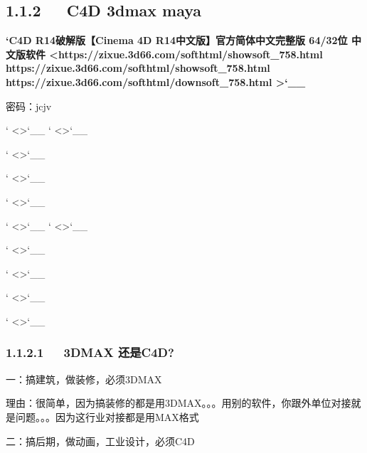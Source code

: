 \documentclass[letterpaper,12pt,english]{sphinxmanual}
\begin{document}
\subsection{1.1.2   C4D 3dmax maya}
\label{\detokenize{000misc/extract:c4d-3dmax-maya}}
{\color{red}\bfseries{}`C4D R14破解版【Cinema 4D R14中文版】官方简体中文完整版 64/32位 中文版软件 <https://zixue.3d66.com/softhtml/showsoft\_758.html https://zixue.3d66.com/softhtml/showsoft\_758.html https://zixue.3d66.com/softhtml/downsoft\_758.html
>`\_\_}




密码：jcjv


` <>`\_\_
` <>`\_\_

` <>`\_\_

` <>`\_\_

` <>`\_\_

` <>`\_\_
` <>`\_\_

` <>`\_\_

` <>`\_\_

` <>`\_\_

` <>`\_\_


\subsubsection{1.1.2.1   3DMAX 还是C4D?}
\label{\detokenize{000misc/extract:dmax-c4d}}
一：搞建筑，做装修，必须3DMAX

理由：很简单，因为搞装修的都是用3DMAX。。。用别的软件，你跟外单位对接就是问题。。。因为这行业对接都是用MAX格式

二：搞后期，做动画，工业设计，必须C4D
\end{document}
